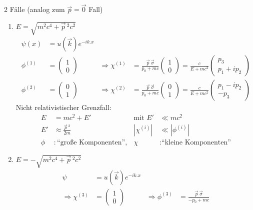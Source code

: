 2 Fälle (analog zum $\vec{p}= \vec{0}$ Fall)
	\begin{enumerate}[1.]
		\item $E= \sqrt{m^2c^4 + \vec{p}\,^2 c^2}$
		\begin{align*}
			\psi (x) &= u(\vec{k}) e^{-ik.x} \\
			\phi^{(1)} &= 
			\begin{pmatrix}
			1 \\ 0
			\end{pmatrix}
			&\Rightarrow 
			\chi^{(1)} &= \frac{\vec{p}~\vec{\sigma}}{p_0 + mc}
			\begin{pmatrix}
			1 \\ 0
			\end{pmatrix}
			= \frac{c}{E + mc^2}
			\begin{pmatrix}
			p_3 \\ p_1 + ip_2
			\end{pmatrix} 
			\\
			\phi^{(2)} &= 
			\begin{pmatrix}
			0 \\ 1
			\end{pmatrix}
			&\Rightarrow 
			\chi^{(2)} &= \frac{\vec{p}~\vec{\sigma}}{p_0 + mc}
			\begin{pmatrix}
			0 \\ 1
			\end{pmatrix}
			= \frac{c}{E + mc^2}
			\begin{pmatrix}
			p_1 - ip_2 \\ -p_3
			\end{pmatrix}
		\end{align*}
	Nicht relativistischer Grenzfall:
		\begin{align*}
			E &= mc^2 + E' &\text{mit } E' &\ll mc^2 \\
			E' &\approx \frac{\vec{p}\,^2}{2m} &
			\left|\chi^{(i)} \right| &\ll \left|\phi^{(i)} \right| \\
			\phi &: \text{``große Komponenten''} ,& \chi &: \text{``kleine Komponenten''}
		\end{align*}
	\item $E=-\sqrt{m^2c^4 + \vec{p}\,^2 c^2}$
		\begin{align*}
			\psi &= u(\vec{k}) e^{-ik.x} \\
			\Rightarrow 
			\chi^{(3)} &= 
			\begin{pmatrix}
			1 \\ 0
			\end{pmatrix}
			&\Rightarrow 
			\phi^{(3)} &= \frac{\vec{p}~\vec{\sigma}}{-p_0 + mc}

\end{align*}
\end{enumerate}
